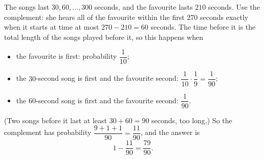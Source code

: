 The songs last $30,60,\dots,300$ seconds, and the favourite lasts $210$ seconds. Use the complement: she hears all of the favourite within the first $270$ seconds exactly when it starts at time at most $270-210=60$ seconds. The time before it is the total length of the songs played before it, so this happens when
\begin{itemize}
\item the favourite is first: probability $\dfrac{1}{10}$;
\item the $30$-second song is first and the favourite second: $\dfrac{1}{10}\cdot\dfrac{1}{9}=\dfrac{1}{90}$;
\item the $60$-second song is first and the favourite second: $\dfrac{1}{90}$.
\end{itemize}
(Two songs before it last at least $30+60=90$ seconds, too long.) So the complement has probability $\dfrac{9+1+1}{90}=\dfrac{11}{90}$, and the answer is
\[
1-\dfrac{11}{90}=\boxed{\dfrac{79}{90}}.
\]
